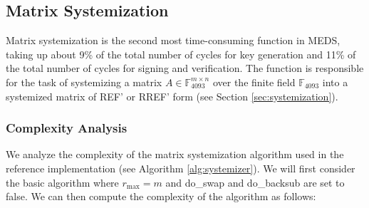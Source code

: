 \documentclass[11pt,a4paper]{report}
\theoremstyle{definition}
\begin{document}
\subsection{Matrix Systemization}
\label{sec:matrixsystemization}
Matrix systemization is the second most time-consuming function in MEDS, taking up about 9\% of the total number of cycles for key generation and 11\% of the total number of cycles for signing and verification. The function is responsible for the task of systemizing a matrix $A \in \mathbb{F}_{4093}^{m \times n}$ over the finite field $\mathbb{F}_{4093}$ into a systemized matrix of REF' or RREF' form (see Section \ref{sec:systemization}).

\subsubsection{Complexity Analysis}
\label{sec:matrixsystemizationcomplexity}
We analyze the complexity of the matrix systemization algorithm used in the reference implementation (see Algorithm \ref{alg:systemizer}). We will first consider the basic algorithm where $r_\text{max} = m$ and do\_swap and do\_backsub are set to false. We can then compute the complexity of the algorithm as follows:

\end{document}
